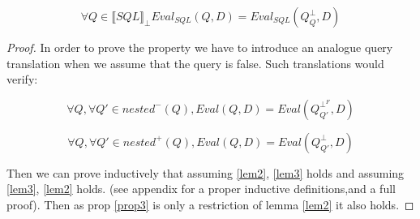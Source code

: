 \begin{myprop}
	\label{prop3}
	$$\forall Q \in \llbracket SQL \rrbracket_\bot Eval_{SQL}(Q,D) = Eval_{SQL}(Q^\bot_Q,D)$$
\end{myprop}

\begin{proof}
	In order to prove the property we have to introduce an analogue query translation when we assume that the query is false. 
	Such translations would verify:
	\begin{mylem}
		\label{lem2}
		$$\forall Q, \forall Q' \in nested^-(Q), Eval(Q,D) = Eval(Q^{\bot^F}_{Q'},D)$$
	\end{mylem}
	\begin{mylem}
		\label{lem3}
		$$\forall Q, \forall Q' \in nested^+(Q), Eval(Q,D) = Eval(Q^\bot_{Q'},D)$$
	\end{mylem}
	Then we can prove inductively that assuming \ref{lem2}, \ref{lem3} holds and assuming \ref{lem3}, \ref{lem2} holds.
	(see appendix for a proper inductive definitions,and a full proof).
	Then as prop \ref{prop3} is only a restriction of lemma \ref{lem2} it also holds.
\end{proof}


